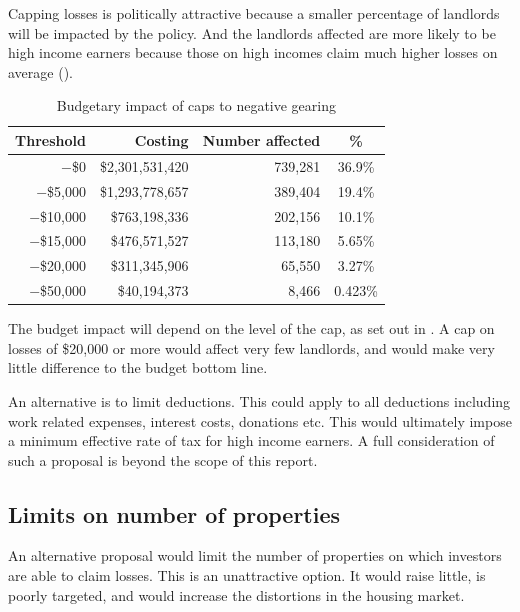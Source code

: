 \documentclass{grattan}\usepackage[]{graphicx}\usepackage[]{color}
\begin{document}
Capping losses is politically attractive because a smaller percentage of landlords will be impacted by the policy. And the landlords affected are more likely to be high income earners because those on high incomes claim much higher losses on average (). 

\begin{table}
\caption{Budgetary impact of caps to negative gearing}\label{tbl:cap-NG}
\begin{tabular}{rrrS}
  \toprule
{\textbf{Threshold}} & {\textbf{Costing}} & {\textbf{Number affected}} & {\textbf{\%}} \\ 
  \midrule
$-$\$0 & \$2,301,531,420 & 739,281 & 36.9\% \\ 
  $-$\$5,000 & \$1,293,778,657 & 389,404 & 19.4\% \\ 
  $-$\$10,000 & \$763,198,336 & 202,156 & 10.1\% \\ 
  $-$\$15,000 & \$476,571,527 & 113,180 & 5.65\% \\ 
  $-$\$20,000 & \$311,345,906 & 65,550 & 3.27\% \\ 
  $-$\$50,000 & \$40,194,373 & 8,466 & 0.423\% \\ 
   \bottomrule
\end{tabular}

\end{table}


The budget impact will depend on the level of the cap, as set out in . A cap on losses of \$20,000 or more would affect very few landlords, and would make very little difference to the budget bottom line.

An alternative is to limit deductions. This could apply to all deductions including work related expenses, interest costs, donations etc. This would ultimately impose a minimum effective rate of tax for high income earners.   A full consideration of such a proposal is beyond the scope of this report. 

\subsection{Limits on number of properties}
An alternative proposal would limit the number of properties on which investors are able to claim losses.  This is an unattractive option. It would raise little, is poorly targeted, and would increase the distortions in the housing market.
\end{document}
